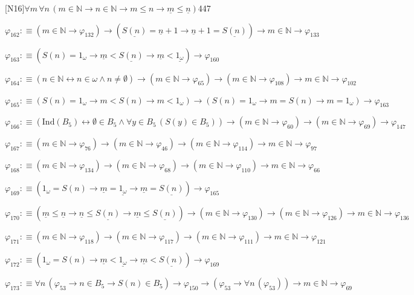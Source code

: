 \begin{fullproof}{[N16]}{$\forall m\,\forall n\,(m \in \mathbb{N} \to n \in \mathbb{N} \to m \leq n \to \underline{m} \leq \underline{n})$}{447}
\begin{abbrevlist}
\item $\varphi_{162} :\equiv (m \in \mathbb{N} \to \varphi_{132}) \to (\underline{S(n)} = \underline{n} + 1 \to \underline{n} + 1 = \underline{S(n)}) \to m \in \mathbb{N} \to \varphi_{133}$
\item $\varphi_{163} :\equiv (S(n) = 1_{\omega} \to \underline{m} < \underline{S(n)} \to \underline{m} < \underline{1_{\omega}}) \to \varphi_{160}$
\item $\varphi_{164} :\equiv (n \in \mathbb{N} \leftrightarrow n \in \omega \land n \neq \emptyset) \to (m \in \mathbb{N} \to \varphi_{65}) \to (m \in \mathbb{N} \to \varphi_{108}) \to m \in \mathbb{N} \to \varphi_{102}$
\item $\varphi_{165} :\equiv (S(n) = 1_{\omega} \to m < S(n) \to m < 1_{\omega}) \to (S(n) = 1_{\omega} \to m = S(n) \to m = 1_{\omega}) \to \varphi_{163}$
\item $\varphi_{166} :\equiv (\mathrm{Ind}(B_{5}) \leftrightarrow \emptyset \in B_{5} \land \forall y \in B_{5}\,(S(y) \in B_{5})) \to (m \in \mathbb{N} \to \varphi_{60}) \to (m \in \mathbb{N} \to \varphi_{69}) \to \varphi_{147}$
\item $\varphi_{167} :\equiv (m \in \mathbb{N} \to \varphi_{76}) \to (m \in \mathbb{N} \to \varphi_{46}) \to (m \in \mathbb{N} \to \varphi_{114}) \to m \in \mathbb{N} \to \varphi_{97}$
\item $\varphi_{168} :\equiv (m \in \mathbb{N} \to \varphi_{134}) \to (m \in \mathbb{N} \to \varphi_{68}) \to (m \in \mathbb{N} \to \varphi_{110}) \to m \in \mathbb{N} \to \varphi_{66}$
\item $\varphi_{169} :\equiv (1_{\omega} = S(n) \to \underline{m} = \underline{1_{\omega}} \to \underline{m} = \underline{S(n)}) \to \varphi_{165}$
\item $\varphi_{170} :\equiv (\underline{m} \leq \underline{n} \to \underline{n} \leq \underline{S(n)} \to \underline{m} \leq \underline{S(n)}) \to (m \in \mathbb{N} \to \varphi_{130}) \to (m \in \mathbb{N} \to \varphi_{126}) \to m \in \mathbb{N} \to \varphi_{136}$
\item $\varphi_{171} :\equiv (m \in \mathbb{N} \to \varphi_{118}) \to (m \in \mathbb{N} \to \varphi_{117}) \to (m \in \mathbb{N} \to \varphi_{111}) \to m \in \mathbb{N} \to \varphi_{121}$
\item $\varphi_{172} :\equiv (1_{\omega} = S(n) \to \underline{m} < \underline{1_{\omega}} \to \underline{m} < \underline{S(n)}) \to \varphi_{169}$
\item $\varphi_{173} :\equiv \forall n\,(\varphi_{53} \to n \in B_{5} \to S(n) \in B_{5}) \to \varphi_{150} \to (\varphi_{53} \to \forall n\,(\varphi_{53})) \to m \in \mathbb{N} \to \varphi_{69}$

\end{abbrevlist}
\end{fullproof}
